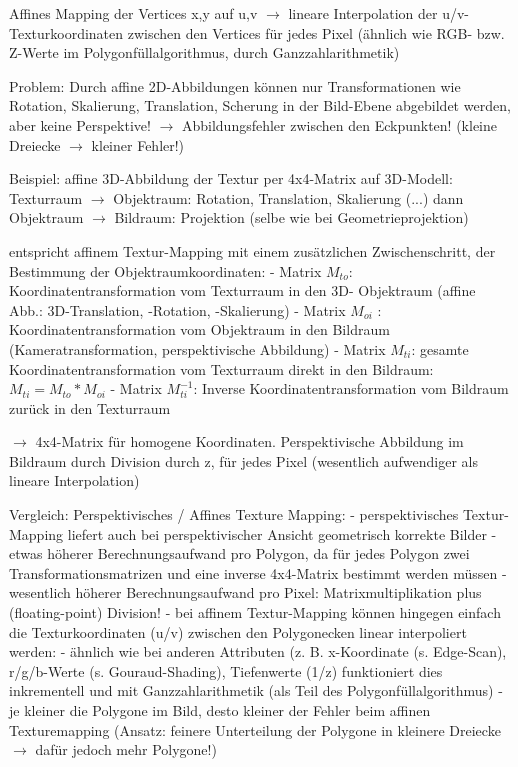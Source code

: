 \documentclass[10pt,landscape]{article}
\begin{document}
\begin{multicols}{3}
  Affines Mapping der Vertices x,y auf u,v $\rightarrow$ lineare Interpolation der u/v-Texturkoordinaten zwischen den Vertices für jedes Pixel (ähnlich wie RGB- bzw. Z-Werte im Polygonfüllalgorithmus, durch Ganzzahlarithmetik)
  
  
  Problem: Durch affine 2D-Abbildungen können nur Transformationen wie Rotation, Skalierung, Translation, Scherung in der Bild-Ebene abgebildet werden, aber keine Perspektive! $\rightarrow$ Abbildungsfehler zwischen den Eckpunkten! (kleine Dreiecke $\rightarrow$ kleiner Fehler!)
  
  Beispiel: affine 3D-Abbildung der Textur per 4x4-Matrix auf 3D-Modell: 
  Texturraum $\rightarrow$ Objektraum: Rotation, Translation, Skalierung (...) dann Objektraum $\rightarrow$ Bildraum: Projektion (selbe wie bei Geometrieprojektion)
  
  
  entspricht affinem Textur-Mapping mit einem zusätzlichen Zwischenschritt, der Bestimmung der Objektraumkoordinaten:
  - Matrix $M_{to}$: Koordinatentransformation vom Texturraum in den 3D- Objektraum (affine Abb.: 3D-Translation, -Rotation, -Skalierung)
  - Matrix $M_{oi}$ : Koordinatentransformation vom Objektraum in den Bildraum (Kameratransformation, perspektivische Abbildung)
  - Matrix $M_{ti}$: gesamte Koordinatentransformation vom Texturraum direkt in den Bildraum: $M_{ti} = M_{to}*M_{oi}$
  - Matrix $M_{ti}^{-1}$: Inverse Koordinatentransformation vom Bildraum zurück in den Texturraum
  
  $\rightarrow$ 4x4-Matrix für homogene Koordinaten. Perspektivische Abbildung im Bildraum durch Division durch z, für jedes Pixel (wesentlich aufwendiger als lineare Interpolation)
  
  Vergleich: Perspektivisches / Affines Texture Mapping:
  - perspektivisches Textur-Mapping liefert auch bei perspektivischer Ansicht geometrisch korrekte Bilder
  - etwas höherer Berechnungsaufwand pro Polygon, da für jedes Polygon zwei Transformationsmatrizen und eine inverse 4x4-Matrix bestimmt werden müssen
  - wesentlich höherer Berechnungsaufwand pro Pixel: Matrixmultiplikation plus (floating-point) Division!
  - bei affinem Textur-Mapping können hingegen einfach die Texturkoordinaten (u/v) zwischen den Polygonecken linear interpoliert werden:
  - ähnlich wie bei anderen Attributen (z. B. x-Koordinate (s. Edge-Scan), r/g/b-Werte (s. Gouraud-Shading), Tiefenwerte (1/z) funktioniert dies inkrementell und mit Ganzzahlarithmetik (als Teil des Polygonfüllalgorithmus)
  - je kleiner die Polygone im Bild, desto kleiner der Fehler beim affinen Texturemapping (Ansatz: feinere Unterteilung der Polygone in kleinere Dreiecke $\rightarrow$ dafür jedoch mehr Polygone!)
  

\end{multicols}
\end{document}
